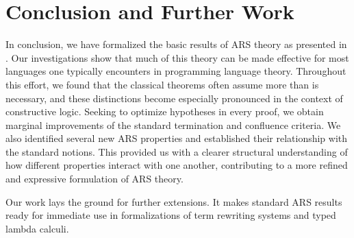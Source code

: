 \section{Conclusion and Further Work}
\label{sec:Conclusion}

In conclusion, we have formalized the basic results of ARS theory as
presented in \cite{Terese}.  Our investigations show that much of this
theory can be made effective for most languages one typically encounters
in programming language theory.
Throughout this effort, we found that the classical theorems often assume
  more than is necessary, and these distinctions become especially pronounced
  in the context of constructive logic.
  Seeking to optimize hypotheses in every proof, we obtain marginal improvements of the standard
termination and confluence criteria.
We also identified several new ARS properties
and established their relationship with the standard notions.
This provided us with a
clearer structural understanding of how different properties interact
with one another, contributing to a more refined and
expressive formulation of ARS theory.

Our work lays the ground for further extensions.  It makes standard ARS results
ready for immediate use in formalizations of term rewriting systems and typed
lambda calculi.



%
